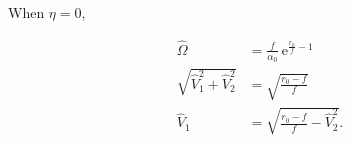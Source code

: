When $\eta = 0$,

\begin{equation}  \label{eq:two-traits-finals3}
\begin{split}
    \hat{\Omega} &= \frac{ f }{ \alpha_0 } ~ \textrm{e}^{\frac{ r_0 }{ f } - 1 } \\
    \sqrt{\hat{V}_1^2 + \hat{V}_2^2} &= \sqrt{ \frac{ r_0 - f }{ f } } \\
    \hat{V}_1 &= \sqrt{ \frac{ r_0 - f }{ f } - \hat{V}_2^2 }
    \textrm{.}
\end{split}
\end{equation}